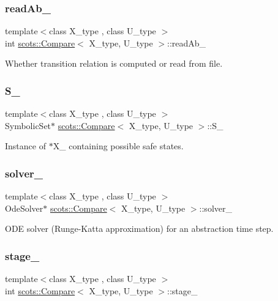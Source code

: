 \subsubsection{\texorpdfstring{read\+Ab\+\_\+}{readAb\_}}
{\footnotesize\ttfamily template$<$class X\+\_\+type , class U\+\_\+type $>$ \\
int \hyperlink{classscots_1_1Compare}{scots\+::\+Compare}$<$ X\+\_\+type, U\+\_\+type $>$\+::read\+Ab\+\_\+}

Whether transition relation is computed or read from file. \mbox{\label{classscots_1_1Compare_a2512f264f83a21365693bbd506b9e7a2}} 
\subsubsection{\texorpdfstring{S\+\_\+}{S\_}}
{\footnotesize\ttfamily template$<$class X\+\_\+type , class U\+\_\+type $>$ \\
Symbolic\+Set$\ast$ \hyperlink{classscots_1_1Compare}{scots\+::\+Compare}$<$ X\+\_\+type, U\+\_\+type $>$\+::S\+\_\+}

Instance of $\ast$\+X\+\_\+ containing possible safe states. \mbox{\label{classscots_1_1Compare_aa42864e8794631891d01f0367e1db277}} 
\subsubsection{\texorpdfstring{solver\+\_\+}{solver\_}}
{\footnotesize\ttfamily template$<$class X\+\_\+type , class U\+\_\+type $>$ \\
Ode\+Solver$\ast$ \hyperlink{classscots_1_1Compare}{scots\+::\+Compare}$<$ X\+\_\+type, U\+\_\+type $>$\+::solver\+\_\+}

O\+DE solver (Runge-\/\+Katta approximation) for an abstraction time step. \mbox{\label{classscots_1_1Compare_ae036e8066fed2391f333c8f64282f12e}} 
\subsubsection{\texorpdfstring{stage\+\_\+}{stage\_}}
{\footnotesize\ttfamily template$<$class X\+\_\+type , class U\+\_\+type $>$ \\
int \hyperlink{classscots_1_1Compare}{scots\+::\+Compare}$<$ X\+\_\+type, U\+\_\+type $>$\+::stage\+\_\+}

